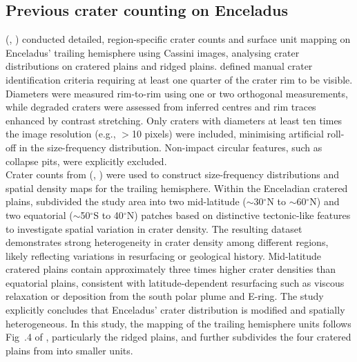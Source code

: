 \documentclass[preprint,11pt,3p,times,authoryear]{elsarticle}
\begin{document}
\subsection{Previous crater counting on Enceladus}
\citeauthor{Kirchoff2009} (\citeyear{Kirchoff2009}, \citeyear{Kirchoff2010}) conducted detailed, region-specific crater counts and surface unit mapping on Enceladus’ trailing hemisphere using Cassini images, analysing crater distributions on cratered plains and ridged plains. \citet{Kirchoff2009} defined manual crater identification criteria requiring at least one quarter of the crater rim to be visible. Diameters were measured rim-to-rim using one or two orthogonal measurements, while degraded craters were assessed from inferred centres and rim traces enhanced by contrast stretching. Only craters with diameters at least ten times the image resolution (e.g., $>$10 pixels) were included, minimising artificial roll-off in the size-frequency distribution. Non-impact circular features, such as collapse pits, were explicitly excluded.\\

Crater counts from \citeauthor{Kirchoff2009} (\citeyear{Kirchoff2009}, \citeyear{Kirchoff2010}) were used to construct size-frequency distributions and spatial density maps for the trailing hemisphere. Within the Enceladian cratered plains, \citet{Kirchoff2009} subdivided the study area into two mid-latitude ($\sim$30$^{\circ}$N to $\sim$60$^{\circ}$N) and two equatorial ($\sim$50$^{\circ}$S to 40$^{\circ}$N) patches based on distinctive tectonic-like features to investigate spatial variation in crater density. The resulting dataset demonstrates strong heterogeneity in crater density among different regions, likely reflecting variations in resurfacing or geological history. Mid-latitude cratered plains contain approximately three times higher crater densities than equatorial plains, consistent with latitude-dependent resurfacing such as viscous relaxation or deposition from the south polar plume and E-ring. The study explicitly concludes that Enceladus’ crater distribution is modified and spatially heterogeneous. 
In this study, the mapping of the trailing hemisphere units follows Fig~.4 of \citet{Kirchoff2009}, particularly the ridged plains, and further subdivides the four cratered plains from \citet{Kirchoff2009} into smaller units.\\
\end{document}
